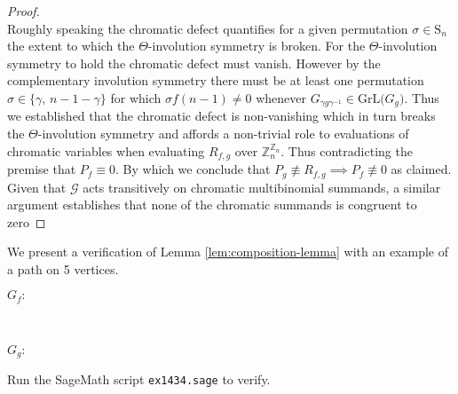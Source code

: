 \begin{proof}
\[\]
Roughly speaking the chromatic defect quantifies for a given permutation $\sigma\in\text{S}_{n}$ the extent to which the $\Theta$-involution symmetry is broken. For the $\Theta$-involution symmetry to hold the chromatic defect must vanish. However by the complementary involution symmetry there must be at least one permutation $\sigma\in\{\gamma,\,n-1-\gamma\}$ for which $\sigma f(n-1)\ne0$ whenever $G_{\gamma g\gamma^{-1}}\in\text{GrL}\big(G_{g}\big)$. Thus we established that the chromatic defect is non-vanishing which in turn breaks the $\Theta$-involution symmetry and affords a non-trivial role to evaluations of chromatic variables when evaluating $R_{f,g}$ over $\mathbb{Z}_{n}^{\mathbb{Z}_{n}}$. Thus contradicting the premise that $P_{f}\equiv0$. By which we conclude that $P_{g}\not\equiv R_{f,g}\implies P_{f}\not\equiv0$ as claimed. Given that $\mathcal{G}$ acts transitively on chromatic multibinomial summands, a similar argument establishes that none of the chromatic summands is congruent to zero

\end{proof}

\begin{example} We present a verification of Lemma \ref{lem:composition-lemma} with an example of a path on 5 vertices.
\ \\
\begin{center}   $G_f: \;$
\end{center}
\ \\
\begin{center}   
$G_g: \;$
\end{center}
Run the SageMath script \texttt{ex1434.sage} to verify.
\end{example}